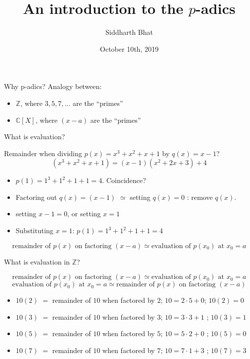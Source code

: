 \documentclass[8pt]{beamer}
\author{Siddharth Bhat}
\date{October 10th, 2019}
\institute{IIIT Theory group \\ Seminar Saturday}
\title{An introduction to the $p$-adics}
\newcommand{\Z}{\mathbb Z}
\begin{document}
\maketitle

\begin{frame}[label=sec-1]{Why p-adics?}
Analogy between:
\begin{itemize}
\item $\mathbb Z$, \pause where $3, 5, 7, \dots$ are the ``primes''\pause
\item $\mathbb C[X]$, \pause where $(x - a)$ are the ``primes''
\end{itemize}
\end{frame}

\begin{frame}{What is evaluation?}

Remainder when dividing $p(x) = x^3 + x^2 + x + 1$ by $q(x) = x - 1$? \pause
{}
\pause
$$(x^3+ x^2 + x + 1) = (x-1)(x^2 + 2x + 3) + 4$$
\pause
\begin{itemize}
\item $p(1) = 1^3 + 1^2 + 1 + 1 = 4$. Coincidence? \pause
\item Factoring out $q(x) = (x-1)$ \pause $ \simeq $ setting $q(x) = 0$ \pause : remove $q(x)$. \pause
\item setting $x - 1 = 0$, or setting $x = 1$ \pause
\item Substituting $x = 1$:  $p(1) = 1^3 + 1^2 + 1 + 1 = 4$ \pause
\end{itemize}

$$
\text{remainder of $p(x)$ on factoring $(x - a)$} \simeq \text{evaluation of $p(x_0)$ at $x_0 = a$}
$$
\end{frame}

\begin{frame}{What is evaluation in $\Z$?}

$$\text{remainder of $p(x)$ on factoring $(x - a)$} \simeq \text{evaluation of $p(x_0)$ at $x_0 = a$}$$
\pause
$$\text{evaluation of $p(x_0)$ at $x_0 = a$} \simeq \text{remainder of $p(x)$ on factoring $(x - a)$} $$
\pause
\begin{itemize}
\item $10(2)$ \pause $ = $ remainder of $10$ when factored by $2$; \pause $10 = 2\cdot5 + 0$\pause; $10(2) = 0$ \pause
\item $10(3)$ \pause $ = $ remainder of $10$ when factored by $3$; \pause $10 = 3\cdot3 + 1$ \pause; $10(3) = 1$ \pause
\item $10(5)$ \pause $ = $ remainder of $10$ when factored by $5$; \pause $10 = 5\cdot 2 + 0$ \pause; $10(5) = 0$ \pause
\item $10(7)$ \pause $ = $ remainder of $10$ when factored by $7$; \pause $10 = 7\cdot1 + 3$ \pause; $10(7) = 3$ \pause
\end{itemize}
\end{frame}
\end{document}
